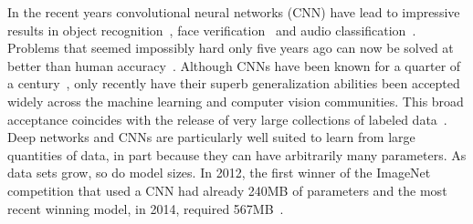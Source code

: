 \documentclass{article} %
\begin{document}
\begin{abstract}
\end{abstract}

In the recent years convolutional neural networks (CNN) have lead to impressive results in object recognition~\cite{krizhevsky2012imagenet}, face verification~\cite{schroff2015facenet} and audio classification~\cite{lee2009unsupervised}. Problems that seemed impossibly hard only five years ago can now be solved at better than human accuracy~\cite{he2015delving}. 
Although CNNs have been known for a quarter of a century~\cite{fukushima1980neocognitron}, only recently have their superb generalization abilities been accepted widely across the machine learning and computer vision communities.
This broad acceptance coincides with the release of very large collections of labeled data~\cite{deng2009imagenet}. Deep networks and CNNs are particularly well suited to learn from large quantities of data, in part because they can have arbitrarily many parameters. As data sets grow, so do model sizes. In 2012, the first winner of the ImageNet competition that used a CNN had already 240MB of parameters and the most recent winning model, in 2014, required 567MB~\cite{SimonyanZ14a}.
\end{document}
